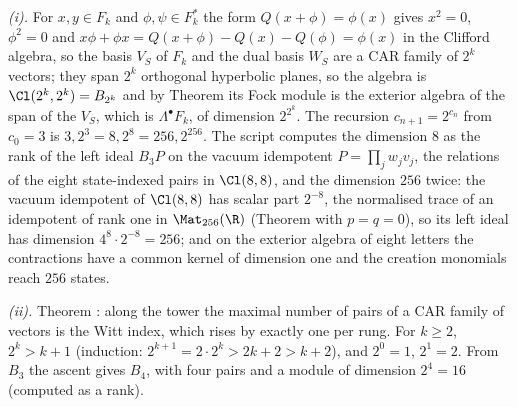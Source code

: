\emph{(i).} For $x, y \in F_{k}$ and $\phi, \psi \in F_{k}^{*}$ the form $Q(x + \phi) = \phi(x)$ gives $x^{2} = 0$, $\phi^{2} = 0$ and $x\phi + \phi x = Q(x + \phi) - Q(x) - Q(\phi) = \phi(x)$ in the Clifford algebra, so the basis $V_{S}$ of $F_{k}$ and the dual basis $W_{S}$ are a CAR family of $2^{k}$ vectors; they span $2^{k}$ orthogonal hyperbolic planes, so the algebra is $\Cl(2^{k}, 2^{k}) = B_{2^{k}}$ and by Theorem  its Fock module is the exterior algebra of the span of the $V_{S}$, which is $\Lambda^{\bullet}F_{k}$, of dimension $2^{2^{k}}$. The recursion $c_{n+1} = 2^{c_{n}}$ from $c_{0} = 3$ is $3, 2^{3} = 8, 2^{8} = 256, 2^{256}$. The script computes the dimension $8$ as the rank of the left ideal $B_{3}P$ on the vacuum idempotent $P = \prod_{j}w_{j}v_{j}$, the relations of the eight state-indexed pairs in $\Cl(8,8)$, and the dimension $256$ twice: the vacuum idempotent of $\Cl(8,8)$ has scalar part $2^{-8}$, the normalised trace of an idempotent of rank one in $\Mat_{256}(\R)$ (Theorem  with $p = q = 0$), so its left ideal has dimension $4^{8} \cdot 2^{-8} = 256$; and on the exterior algebra of eight letters the contractions have a common kernel of dimension one and the creation monomials reach $256$ states.

\emph{(ii).} Theorem : along the tower the maximal number of pairs of a CAR family of vectors is the Witt index, which rises by exactly one per rung. For $k \ge 2$, $2^{k} > k + 1$ (induction: $2^{k+1} = 2 \cdot 2^{k} > 2k + 2 > k + 2$), and $2^{0} = 1$, $2^{1} = 2$. From $B_{3}$ the ascent gives $B_{4}$, with four pairs and a module of dimension $2^{4} = 16$ (computed as a rank).


